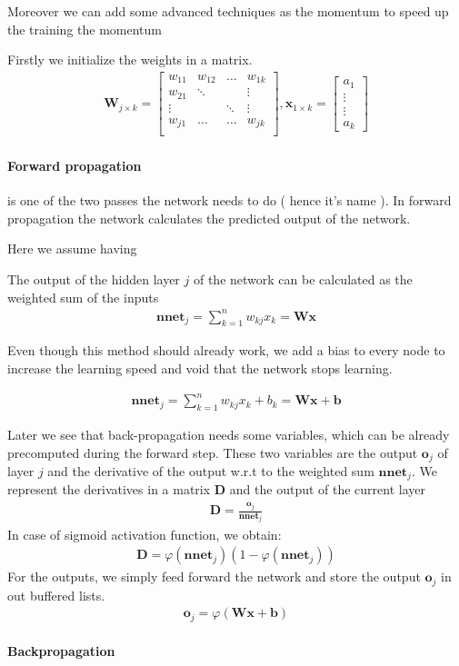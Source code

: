 Moreover we can add some advanced techniques as the momentum to speed up the training the momentum 

Firstly we initialize the weights in a matrix. 
\begin{align}
\mathbf{W}_{j \times k } = \begin{bmatrix}
w_{11} & w_{12} & \ldots & w_{1k}\\
w_{21} & \ddots & & \vdots\\
\vdots & & \ddots  & \vdots\\
w_{j1} & \ldots & \ldots  & w_{jk}\\
\end{bmatrix},
\mathbf{x}_{1 \times k} = \begin{bmatrix}
a_{1} \\
\vdots\\
\vdots \\
a_{k}
\end{bmatrix}
\end{align}


\paragraph{Forward propagation} is one of the two passes the network needs to do ( hence it's name ).
In forward propagation the network calculates the predicted output of the network.

Here we assume having 

The output of the hidden layer $j$ of the network can be calculated as the weighted sum of the inputs
\begin{align}
\mathbf{nnet}_j = \sum_{k=1}^{n}w_{kj}x_k = \mathbf{W} \mathbf{x}
\end{align}

Even though this method should already work, we add a bias to every node to increase the learning speed and void that the network stops learning.

\begin{align}
\mathbf{nnet}_j = \sum_{k=1}^{n}w_{kj}x_k + b_k = \mathbf{W} \mathbf{x} + \mathbf{b}
\end{align}


Later we see that back-propagation needs some variables, which can be already precomputed during the forward step. These two variables are the output $\mathbf{o}_j$ of layer $j$ and the derivative of the output w.r.t to the weighted sum $\mathbf{nnet}_j$. We represent the derivatives in a matrix $\mathbf{D}$ and the output of the current layer 
\begin{align}
\mathbf{D} = \frac{\mathbf{o}_j}{\mathbf{nnet}_j}
\end{align}
In case of sigmoid activation function, we obtain:
\begin{align}
\mathbf{D} = \varphi \left( \mathbf{nnet}_j \right) \left( 1 - \varphi \left(\mathbf{nnet}_j \right) \right)
\end{align}
For the outputs, we simply feed forward the network and store the output $\mathbf{o}_j$ in out buffered lists.
\begin{align}
\mathbf{o}_j = \varphi \left( \mathbf{Wx+b} \right)
\end{align}


\paragraph{Backpropagation}